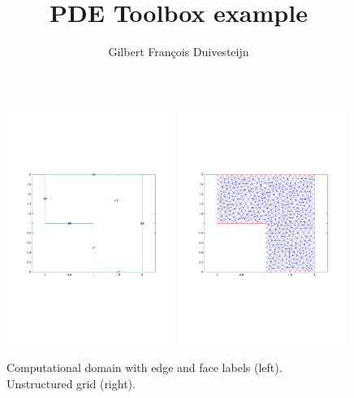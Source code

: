 \documentclass[11pt, a4paper]{article}
\title{PDE Toolbox example}
\author{Gilbert Fran\c cois Duivesteijn}
\begin{document}
\maketitle

\begin{figure}
  \includegraphics[width=0.49\textwidth]{assets/domain.pdf}
  \includegraphics[width=0.49\textwidth]{assets/grid.pdf}
  \caption{Computational domain with edge and face labels (left). Unstructured grid (right).}\label{fig:domain}
\end{figure}
\end{document}
